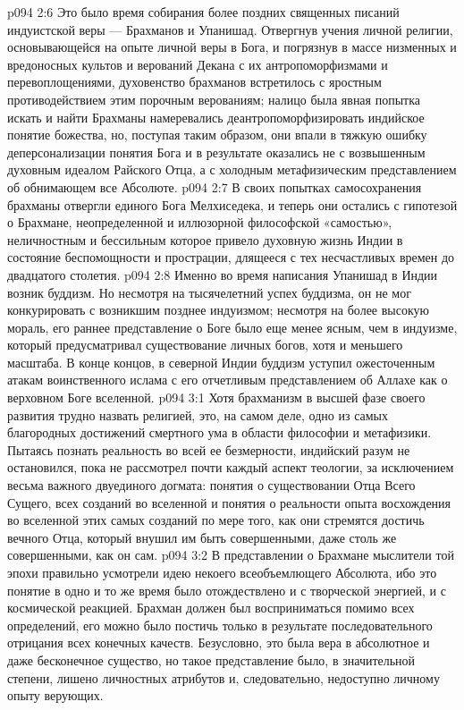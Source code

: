 \vs p094 2:6 \pc Это было время собирания более поздних священных писаний индуистской веры --- Брахманов и Упанишад. Отвергнув учения личной религии, основывающейся на опыте личной веры в Бога, и погрязнув в массе низменных и вредоносных культов и верований Декана с их антропоморфизмами и перевоплощениями, духовенство брахманов встретилось с яростным противодействием этим порочным верованиям; налицо была явная попытка искать и найти  Брахманы намеревались деантропоморфизировать индийское понятие божества, но, поступая таким образом, они впали в тяжкую ошибку деперсонализации понятия Бога и в результате оказались не с возвышенным духовным идеалом Райского Отца, а с холодным метафизическим представлением об обнимающем все Абсолюте.
\vs p094 2:7 В своих попытках самосохранения брахманы отвергли единого Бога Мелхиседека, и теперь они остались с гипотезой о Брахмане, неопределенной и иллюзорной философской «самостью», неличностным и бессильным  которое привело духовную жизнь Индии в состояние беспомощности и прострации, длящееся с тех несчастливых времен до двадцатого столетия.
\vs p094 2:8 \pc Именно во время написания Упанишад в Индии возник буддизм. Но несмотря на тысячелетний успех буддизма, он не мог конкурировать с возникшим позднее индуизмом; несмотря на более высокую мораль, его раннее представление о Боге было еще менее ясным, чем в индуизме, который предусматривал существование личных богов, хотя и меньшего масштаба. В конце концов, в северной Индии буддизм уступил ожесточенным атакам воинственного ислама с его отчетливым представлением об Аллахе как о верховном Боге вселенной.
\vs p094 3:1 Хотя брахманизм в высшей фазе своего развития трудно назвать религией, это, на самом деле, одно из самых благородных достижений смертного ума в области философии и метафизики. Пытаясь познать реальность во всей ее безмерности, индийский разум не остановился, пока не рассмотрел почти каждый аспект теологии, за исключением весьма важного двуединого догмата: понятия о существовании Отца Всего Сущего, всех созданий во вселенной и понятия о реальности опыта восхождения во вселенной этих самых созданий по мере того, как они стремятся достичь вечного Отца, который внушил им быть совершенными, даже столь же совершенными, как он сам.
\vs p094 3:2 В представлении о Брахмане мыслители той эпохи правильно усмотрели идею некоего всеобъемлющего Абсолюта, ибо это понятие в одно и то же время было отождествлено и с творческой энергией, и с космической реакцией. Брахман должен был восприниматься помимо всех определений, его можно было постичь только в результате последовательного отрицания всех конечных качеств. Безусловно, это была вера в абсолютное и даже бесконечное существо, но такое представление было, в значительной степени, лишено личностных атрибутов и, следовательно, недоступно личному опыту верующих.

